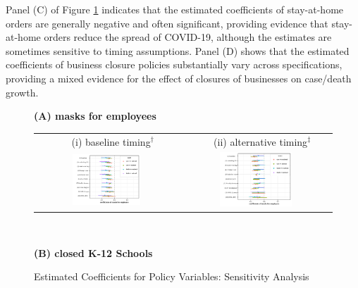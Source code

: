 \documentclass[3p, longtitle]{elsarticle}
\theoremstyle{definition}
\begin{document}
Panel (C) of Figure  \ref{fig:whisker} indicates that the estimated coefficients of stay-at-home orders  are generally negative and often significant, providing evidence that stay-at-home orders reduce the spread of COVID-19, although the estimates are sometimes sensitive to timing assumptions.  Panel (D) shows that the estimated coefficients of business closure policies substantially vary across specifications, providing a mixed evidence for the effect of closures of businesses on case/death growth.

\begin{figure}[ht]
  \caption{Estimated Coefficients for  Policy Variables: Sensitivity Analysis \label{fig:whisker}}\bigskip
  \begin{minipage}{\linewidth}
    \centering
   {\textbf{(A)  masks for employees}}\\
    \medskip
    \begin{tabular}{cc}
 $\quad$  (i) baseline timing$^\dagger$ &$\quad$ (ii) alternative timing$^\ddagger$\\
      \includegraphics[width=0.5\textwidth]{tables_and_figures/pmaskbus-whisker-14}
      &
      \includegraphics[width=0.5\textwidth]{tables_and_figures/pmaskbus-whisker-7}
    \end{tabular}
  \end{minipage} \\\smallskip
    \begin{minipage}{\linewidth}
    \centering
     {\textbf{(B)  closed K-12 Schools}}\\

\end{minipage}
\end{figure}
\end{document}
